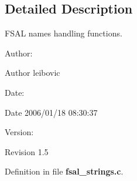 \subsection{Detailed Description}
FSAL names handling functions. 

\begin{Desc}
\item[Author:]\begin{Desc}
\item[Author]leibovic \end{Desc}
\end{Desc}
\begin{Desc}
\item[Date:]\begin{Desc}
\item[Date]2006/01/18 08:30:37 \end{Desc}
\end{Desc}
\begin{Desc}
\item[Version:]\begin{Desc}
\item[Revision]1.5 \end{Desc}
\end{Desc}


Definition in file {\bf fsal\_\-strings.c}.